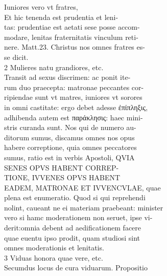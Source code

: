 \documentclass{article}
\begin{document}
\begin{pages}
                Iuniores vero vt fratres, \\
                Et hic tenenda est prudentia et leni- \\
                tas: prudentiae est aetati sese posse accom- \\
                modare, lenitas fraternitatis vinculum reti- \\
                nere. Matt.23. Christus nos omnes fratres es- \\
                se dicit. \\
                2 Mulieres natu grandiores, etc. \\
                Transit ad sexus discrimen: ac ponit ite- \\
                rum duo praecepta: matronae peccantes cor- \\
                ripiendae sunt vt matres, iuniores vt sorores \\
                in omni castitate: ergo debet adesse ἐπίπληξις, \\
                adhibenda autem est παράκλησις: haec mini- \\
                stris curanda sunt. Nos qui de numero au- \\
                ditorum sumus, discamus omnes nos opus \\
                habere correptione, quia omnes peccatores \\
                sumus, ratio est in verbis Apostoli, QVIA \\
                SENES OPVS HABENT CORREP- \\
                TIONE, IVVENES OPVS HABENT \\
                EADEM, MATRONAE ET IVVENCVLAE, quae \\
                plena est enumeratio. Quod si qui reprehendi \\
                nolint, caueant ne ei materiam praebeant: minister \\
                vero si hamc moderationem non seruet, ipse vi- \\
                derit:omnia debent ad aedificationem facere \\
                quae euentu ipso prodit, quam studiosi sint \\
                omnes moderationis et lenitatis. \\
                3 Viduas honora quae vere, etc. \\
                Secumdus locus de cura viduarum. Propositio \\

\end{pages}
\end{document}

